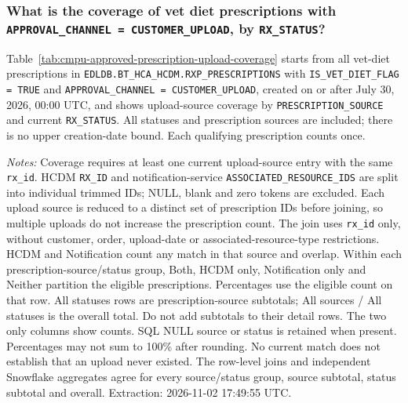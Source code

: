 \subsubsection{What is the coverage of vet diet prescriptions with \texttt{APPROVAL\_CHANNEL = CUSTOMER\_UPLOAD}, by \texttt{RX\_STATUS}?}
\label{subsec:cmpu-approved-prescription-upload-coverage}
Table~\ref{tab:cmpu-approved-prescription-upload-coverage} starts from all vet-diet prescriptions in \texttt{EDLDB.BT\_HCA\_HCDM.RXP\_PRESCRIPTIONS} with \texttt{IS\_VET\_DIET\_FLAG = TRUE} and \texttt{APPROVAL\_CHANNEL = CUSTOMER\_UPLOAD}, created on or after July 30, 2026, 00:00 UTC, and shows upload-source coverage by \texttt{PRESCRIPTION\_SOURCE} and current \texttt{RX\_STATUS}. All statuses and prescription sources are included; there is no upper creation-date bound. Each qualifying prescription counts once.


\noindent\textit{Notes:} Coverage requires at least one current upload-source entry with the same \texttt{rx\_id}. HCDM \texttt{RX\_ID} and notification-service \texttt{ASSOCIATED\_RESOURCE\_IDS} are split into individual trimmed IDs; NULL, blank and zero tokens are excluded. Each upload source is reduced to a distinct set of prescription IDs before joining, so multiple uploads do not increase the prescription count. The join uses \texttt{rx\_id} only, without customer, order, upload-date or associated-resource-type restrictions. HCDM and Notification count any match in that source and overlap. Within each prescription-source/status group, Both, HCDM only, Notification only and Neither partition the eligible prescriptions. Percentages use the eligible count on that row. All statuses rows are prescription-source subtotals; All sources / All statuses is the overall total. Do not add subtotals to their detail rows. The two only columns show counts. SQL NULL source or status is retained when present. Percentages may not sum to 100\% after rounding. No current match does not establish that an upload never existed. The row-level joins and independent Snowflake aggregates agree for every source/status group, source subtotal, status subtotal and overall. Extraction: 2026-11-02 17:49:55 UTC.



\clearpage

